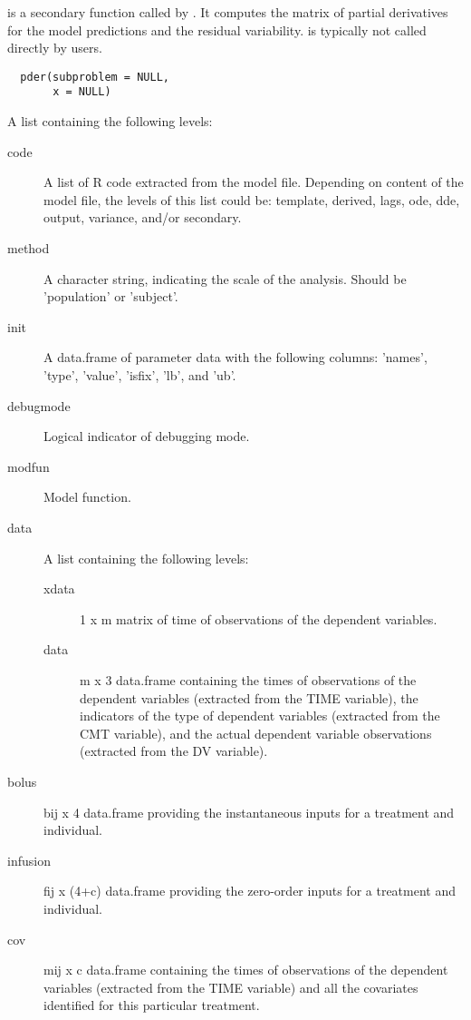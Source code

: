 %
\begin{Description}\relax
{} is a secondary function called by . It 
computes the matrix of partial derivatives for the model predictions and the
residual variability.  is typically not called directly by users.
\end{Description}
%
\begin{Usage}
\begin{verbatim}
  pder(subproblem = NULL,
       x = NULL)
\end{verbatim}
\end{Usage}
%
\begin{Arguments}
\begin{ldescription}
\item[\code{subproblem}] A list containing the following levels:\begin{description}

\item[code] A list of R code extracted from the model file. Depending on 
content of the model file, the levels of this list could be: template,
derived, lags, ode, dde, output, variance, and/or secondary.
\item[method] A character string, indicating the scale of the analysis. Should
be 'population' or 'subject'.
\item[init] A data.frame of parameter data with the following columns:
'names', 'type', 'value', 'isfix', 'lb', and 'ub'.
\item[debugmode] Logical indicator of debugging mode.
\item[modfun] Model function.
\item[data] A list containing the following levels:\begin{description}

\item[xdata] 1 x m matrix of time of observations of the dependent
variables.
\item[data] m x 3 data.frame containing the times of observations of the
dependent variables (extracted from the TIME variable), the indicators 
of the type of dependent variables (extracted from the CMT variable), 
and the actual dependent variable observations (extracted from the DV 
variable).

\end{description}


\item[bolus] bij x 4 data.frame providing the instantaneous inputs for a
treatment and individual.
\item[infusion] fij x (4+c) data.frame providing the zero-order inputs for a
treatment and individual.
\item[cov] mij x c data.frame containing the times of observations of the 
dependent variables (extracted from the TIME variable) and all the
covariates identified for this particular treatment.


\end{description}
\end{ldescription}
\end{Arguments}
